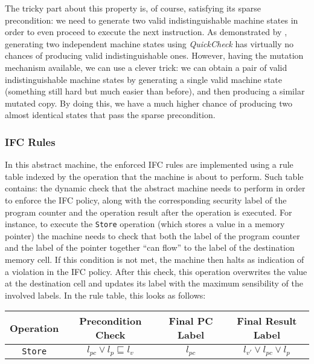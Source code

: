 \documentclass[acmsmall, anonymous]{acmart}
\newcommand{\quickcheck}{\textit{QuickCheck}\xspace}
\begin{document}
The tricky part about this property is, of course, satisfying its sparse
precondition: we need to generate two valid indistinguishable machine states in
order to even proceed to execute the next instruction.
%
As demonstrated by \citeauthor{lampropoulos2019coverage}, generating two
independent machine states using \quickcheck has virtually no chances of
producing valid indistinguishable ones.
%
However, having the mutation mechanism available, we can use a clever trick: we
can obtain a pair of valid indistinguishable machine states by generating a
single valid machine state (something still hard but much easier than before),
and then producing a similar mutated copy.
%
By doing this, we have a much higher chance of producing two almost identical
states that pass the sparse precondition.

\subsubsection{IFC Rules}

In this abstract machine, the enforced IFC rules are implemented using a rule
table indexed by the operation that the machine is about to perform.
%
Such table contains: the dynamic check that the abstract machine needs to
perform in order to enforce the IFC policy, along with the corresponding
security label of the program counter and the operation result after the
operation is executed.
%
For instance, to execute the \texttt{Store} operation (which stores a value in a
memory pointer) the machine needs to check that both the label of the program
counter and the label of the pointer together ``can flow'' to the label of the
destination memory cell.
%
If this condition is not met, the machine then halts as indication of a
violation in the IFC policy.
%
After this check, this operation overwrites the value at the destination cell
and updates its label with the maximum sensibility of the involved labels.
%
In the rule table, this looks as follows:

\begin{center}
\footnotesize
\begin{tabular}{|c|c|c|c|}
\hline
\textbf{Operation}
& \textbf{Precondition Check}
& \textbf{Final PC Label}
& \textbf{Final Result Label} \\
\hline
\texttt{Store}
& $l_{pc} \vee l_{p} \sqsubseteq l_{v}$
& $l_{pc}$
& $l_{v'} \vee l_{pc} \vee l_{p}$ \\
\hline
\end{tabular}
\end{center}
\end{document}
